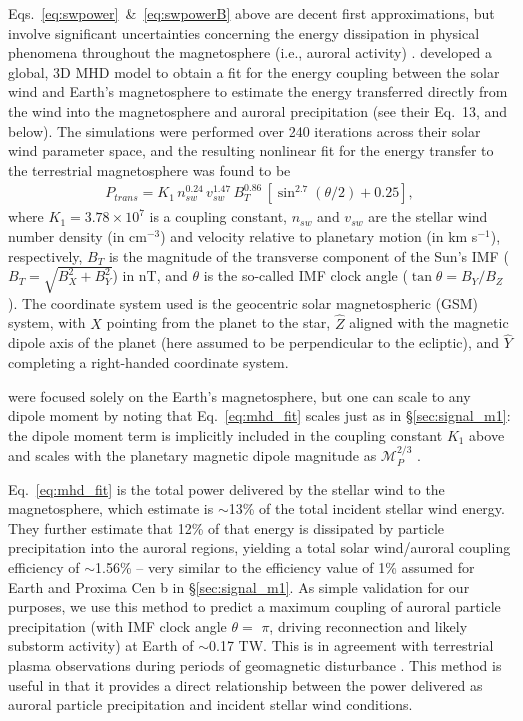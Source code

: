 \documentclass{emulateapj}
\begin{document}
Eqs.~\ref{eq:swpower}~\&~\ref{eq:swpowerB} above are decent first approximations, but involve significant uncertainties concerning the energy dissipation in physical phenomena throughout the magnetosphere (i.e., auroral activity) \citep{Perreault1978,Akasofu1981}. \citet{Wang2014} developed a global, 3D MHD model to obtain a fit for the energy coupling between the solar wind and Earth's magnetosphere to estimate the energy transferred directly from the wind into the magnetosphere and auroral precipitation (see their Eq.~13, and below). The simulations were performed over 240 iterations across their solar wind parameter space, and the resulting nonlinear fit for the energy transfer to the terrestrial magnetosphere was found to be
%
\begin{align}
    P_{trans} = K_1\,n_{sw}^{0.24}\,v_{sw}^{1.47}\,B_T^{0.86}\,\left[\sin^{2.7}(\theta/2)+0.25 \right] \label{eq:mhd_fit},
\end{align}
where $K_1=3.78\times 10^7$ is a coupling constant, $n_{sw}$ and $v_{sw}$ are the stellar wind number density (in cm$^{-3}$) and velocity relative to planetary motion (in km s$^{-1}$), respectively, $B_T$ is the magnitude of the transverse component of the Sun's IMF ($B_T = \sqrt{B_X^2+B_Y^2}$) in nT, and $\theta$ is the so-called IMF clock angle ($\tan\theta = B_Y/B_Z $). The coordinate system used is the geocentric solar magnetospheric (GSM) system, with $\hat{X}$ pointing from the planet to the star, $\hat{Z}$ aligned with the magnetic dipole axis of the planet (here assumed to be perpendicular to the ecliptic), and $\hat{Y}$ completing a right-handed coordinate system.

\citet{Wang2014} were focused solely on the Earth's magnetosphere, but one can scale to any dipole moment by noting that Eq.~\ref{eq:mhd_fit} scales just as in \S\ref{sec:signal_m1}: the dipole moment term is implicitly included in the coupling constant $K_1$ above and scales with the planetary magnetic dipole magnitude as $\mathcal{M}_P^{2/3}$ \citep[][also Eqs.~\ref{eq:swpower} \& \ref{eq:pressbal} above]{Vasyliunas1982}.
 
Eq.~\ref{eq:mhd_fit} is the total power delivered by the stellar wind to the magnetosphere, which \citet{Wang2014} estimate is $\sim$13\% of the total incident stellar wind energy. They further estimate that 12\% of that energy is dissipated by particle precipitation into the auroral regions, yielding a total solar wind/auroral coupling efficiency of $\sim$1.56\% -- very similar to the efficiency value of 1\% assumed for Earth and Proxima Cen b in \S\ref{sec:signal_m1}. As simple validation for our purposes, we use this method to predict a maximum coupling of auroral particle precipitation (with IMF clock angle $\theta =$ $\pi$, driving reconnection and likely substorm activity) at Earth of $\sim$0.17 TW. This is in agreement with terrestrial plasma observations during periods of geomagnetic disturbance \citep[e.g.][]{Hubert2002}. This method is useful in that it provides a direct relationship between the power delivered as auroral particle precipitation and incident stellar wind conditions.
\end{document}
